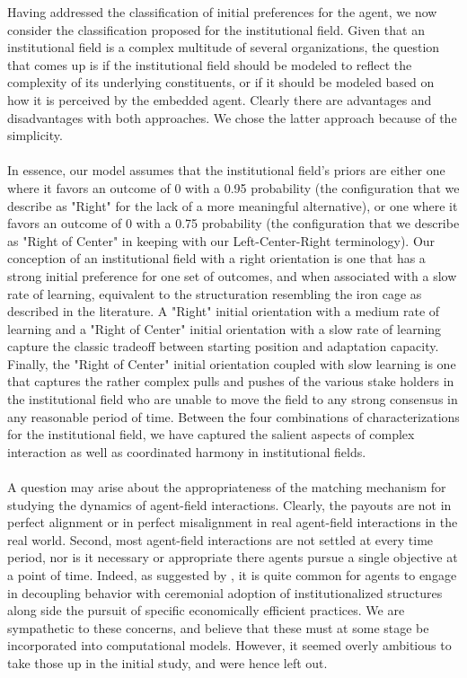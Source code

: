 \documentclass[12pt]{article}
\begin{document}
\noindent Having addressed the classification of initial preferences for the agent, we now consider the classification proposed for the institutional field. Given that an institutional field is a complex multitude of several organizations, the question that comes up is if the institutional field should be modeled to reflect the complexity of its underlying constituents, or if it should be modeled based on how it is perceived by the embedded agent. Clearly there are advantages and disadvantages with both approaches. We chose the latter approach because of the simplicity. \\\\
In essence, our model assumes that the institutional field's priors are either one where it favors an outcome of 0 with a 0.95 probability (the configuration that we describe as "Right" for the lack of a more meaningful alternative), or one where it favors an outcome of 0 with a 0.75 probability (the configuration that we describe as "Right of Center" in keeping with our Left-Center-Right terminology). Our conception of an institutional field with a right orientation is one that has a strong initial preference for one set of outcomes, and when associated with a slow rate of learning, equivalent to the structuration resembling the iron cage as described in the literature. A "Right" initial orientation with a medium rate of learning and a "Right of Center" initial orientation with a slow rate of learning capture the classic tradeoff between starting position and adaptation capacity. Finally, the "Right of Center" initial orientation coupled with slow learning is one that captures the rather complex pulls and pushes of the various stake holders in the institutional field who are unable to move the field to any strong consensus in any reasonable period of time. Between the four combinations of characterizations for the institutional field,  we have captured the salient aspects of complex interaction as well as coordinated harmony in institutional fields.\\\\

\noindent A question may arise about the appropriateness of the matching mechanism for studying the dynamics of agent-field interactions. Clearly, the payouts are not in perfect alignment or in perfect misalignment in real agent-field interactions in the real world. Second, most agent-field interactions are not settled at every time period, nor is it necessary or appropriate there agents pursue a single objective at a point of time. Indeed, as suggested by \cite{Kostova2008}, it is quite common for agents to engage in decoupling behavior with ceremonial adoption of institutionalized structures along side the pursuit of specific economically efficient practices. We are sympathetic to these concerns, and believe that these must at some stage be incorporated into computational models. However, it seemed overly ambitious to take those up in the initial study, and were hence left out.\\\\
\end{document}
